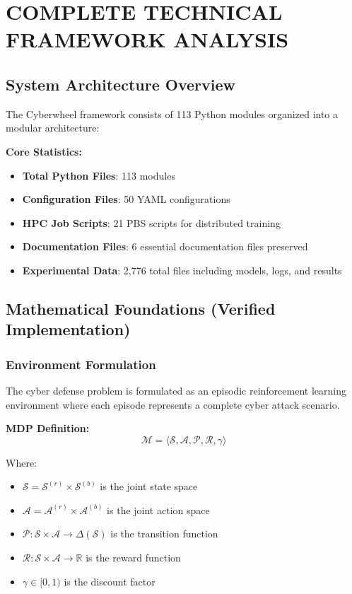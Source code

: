 \documentclass[11pt]{article}
\begin{document}
\section{COMPLETE TECHNICAL FRAMEWORK ANALYSIS}

\subsection{System Architecture Overview}

The Cyberwheel framework consists of 113 Python modules organized into a modular architecture:

\textbf{Core Statistics:}
\begin{itemize}
\item \textbf{Total Python Files}: 113 modules
\item \textbf{Configuration Files}: 50 YAML configurations
\item \textbf{HPC Job Scripts}: 21 PBS scripts for distributed training
\item \textbf{Documentation Files}: 6 essential documentation files preserved
\item \textbf{Experimental Data}: 2,776 total files including models, logs, and results
\end{itemize}

\subsection{Mathematical Foundations (Verified Implementation)}

\subsubsection{Environment Formulation}

The cyber defense problem is formulated as an episodic reinforcement learning environment where each episode represents a complete cyber attack scenario.

\textbf{MDP Definition:}
\begin{equation}
\mathcal{M} = \langle \mathcal{S}, \mathcal{A}, \mathcal{P}, \mathcal{R}, \gamma \rangle
\end{equation}

Where:
\begin{itemize}
\item $\mathcal{S} = \mathcal{S}^{(r)} \times \mathcal{S}^{(b)}$ is the joint state space
\item $\mathcal{A} = \mathcal{A}^{(r)} \times \mathcal{A}^{(b)}$ is the joint action space  
\item $\mathcal{P}: \mathcal{S} \times \mathcal{A} \rightarrow \Delta(\mathcal{S})$ is the transition function
\item $\mathcal{R}: \mathcal{S} \times \mathcal{A} \rightarrow \mathbb{R}$ is the reward function
\item $\gamma \in [0,1)$ is the discount factor
\end{itemize}
\end{document}
